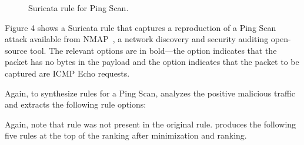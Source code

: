 \documentclass[sigconf,anonymous]{acmart}
\begin{document}
\begin{figure}[h!]
  
  \caption{Suricata rule for Ping Scan.}
  \label{fig:pingscan-example}
\end{figure}

Figure 4 shows a Suricata rule that captures a reproduction of a Ping
Scan attack available from NMAP~\cite{netmap}, a network discovery and
security auditing open-source tool. The relevant options are in
bold---the option  indicates that the packet has no
bytes in the payload and the option  indicates that
the packet to be captured are ICMP Echo requests.

Again, to synthesize rules for a Ping Scan, \tname{} analyzes the
positive malicious traffic and extracts the following rule options:

\begin{figure}[h]
  \vspace{-2ex}
  
  \vspace{-3ex}  
\end{figure}


Again, note that rule  was not present in the original
rule.  \tname{} produces the following five rules at the top of the
ranking after minimization and ranking.


\subsection{}
\label{sec:content-example}



\end{document}
